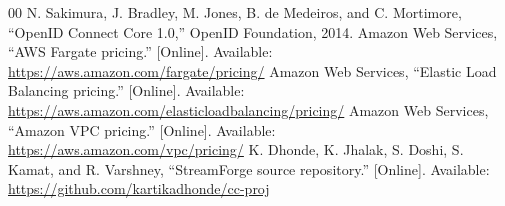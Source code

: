 \documentclass[conference]{IEEEtran}
\begin{document}
\begin{thebibliography}{00}
 N. Sakimura, J. Bradley, M. Jones, B. de Medeiros, and C. Mortimore, ``OpenID Connect Core 1.0,'' OpenID Foundation, 2014.
 Amazon Web Services, ``AWS Fargate pricing.'' [Online]. Available: \url{https://aws.amazon.com/fargate/pricing/}
 Amazon Web Services, ``Elastic Load Balancing pricing.'' [Online]. Available: \url{https://aws.amazon.com/elasticloadbalancing/pricing/}
 Amazon Web Services, ``Amazon VPC pricing.'' [Online]. Available: \url{https://aws.amazon.com/vpc/pricing/}
 K. Dhonde, K. Jhalak, S. Doshi, S. Kamat, and R. Varshney, ``StreamForge source repository.'' [Online]. Available: \url{https://github.com/kartikadhonde/cc-proj}
\end{thebibliography}
\end{document}
